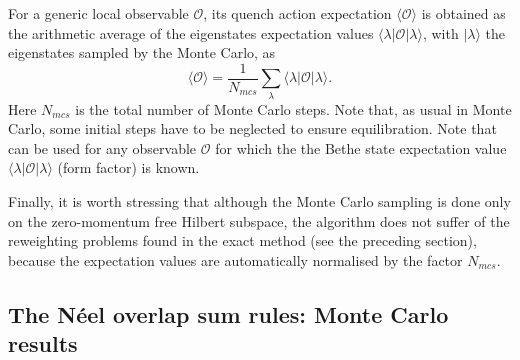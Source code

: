 \documentclass[11pt]{iopart}
\begin{document}
For a generic local observable ${\mathcal O}$, its quench action expectation $\langle{\mathcal O}
\rangle$ is obtained as the arithmetic average 
of the eigenstates expectation values $\langle\lambda|{\mathcal O}|\lambda\rangle$, 
with $|\lambda\rangle$ the eigenstates sampled by the Monte Carlo, as 
%
\begin{equation}
\label{qamc-obs}
\langle{\mathcal O}\rangle=\frac{1}{N_{mcs}}\sum\limits_{\lambda}\langle\lambda|
{\mathcal O}|\lambda\rangle. 
\end{equation}
%
Here $N_{mcs}$ is the total number of Monte Carlo steps. Note that, as usual in 
Monte Carlo, some initial steps have to be neglected to ensure equilibration. 
Note that~ can be used for any observable ${\mathcal O}$ for 
which the the Bethe state expectation value $\langle\lambda|{\mathcal O}|\lambda
\rangle$ (form factor) is known. 

Finally, it is worth stressing that although the Monte Carlo sampling is done only on the 
zero-momentum free Hilbert subspace, the algorithm does not suffer of the reweighting problems 
found in the exact method (see the preceding section), because the expectation values 
 are automatically normalised by the factor $N_{mcs}$.

\subsection{The N\'eel overlap sum rules: Monte Carlo results}
\label{sec:6.2}
\end{document}
